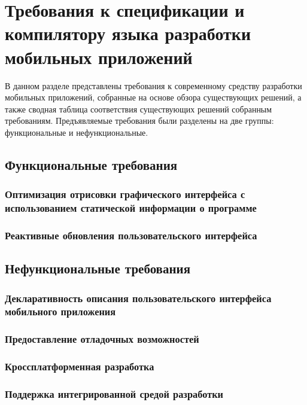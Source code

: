 \section{Требования к спецификации и компилятору языка разработки мобильных приложений}
\label{requirements-section}
В данном разделе представлены требования к современному средству
разработки мобильных приложений, собранные на основе обзора существующих
решений, а также сводная таблица соответствия существующих решений собранным
требованиям. Предъявляемые требования были разделены на две группы:
функциональные и нефункциональные.


\subsection{Функциональные требования}
\subsubsection*{Оптимизация отрисовки графического интерфейса с использованием статической информации о программе}

\subsubsection*{Реактивные обновления пользовательского интерфейса}


\subsection{Нефункциональные требования}
\subsubsection*{Декларативность описания пользовательского интерфейса мобильного приложения}

\subsubsection*{Предоставление отладочных возможностей}

\subsubsection*{Кроссплатформенная разработка}

\subsubsection*{Поддержка интегрированной средой разработки}


